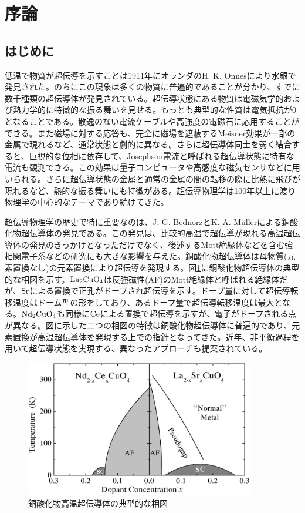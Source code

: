 \section{序論}
\subsection{はじめに}
低温で物質が超伝導を示すことは1911年にオランダのH. K. Onnesにより水銀で発見された。のちにこの現象は多くの物質に普遍的であることが分かり、すでに数千種類の超伝導体が発見されている。超伝導状態にある物質は電磁気学的および熱力学的に特徴的な振る舞いを見せる。もっとも典型的な性質は電気抵抗が0となることである。散逸のない電流ケーブルや高強度の電磁石に応用することができる。また磁場に対する応答も、完全に磁場を遮蔽するMeisner効果が一部の金属で現れるなど、通常状態と劇的に異なる。さらに超伝導体同士を弱く結合すると、巨視的な位相に依存して、Josephson電流と呼ばれる超伝導状態に特有な電流も観測できる。この効果は量子コンピュータや高感度な磁気センサなどに用いられる。さらに超伝導状態の金属と通常の金属の間の転移の際に比熱に飛びが現れるなど、熱的な振る舞いにも特徴がある。超伝導物理学は100年以上に渡り物理学の中心的なテーマであり続けてきた。

超伝導物理学の歴史で特に重要なのは、J. G. BednorzとK. A. M\"ullerによる銅酸化物超伝導体の発見である。この発見は、比較的高温で超伝導が現れる高温超伝導体の発見のきっかけとなっただけでなく、後述するMott絶縁体などを含む強相関電子系などの研究にも大きな影響を与えた。銅酸化物超伝導体は母物質(元素置換なし)の元素置換により超伝導を発現する\cite{Lee2006}。図\ref{fig:phase_diagram}に銅酸化物超伝導体の典型的な相図を示す\cite{Andrea2003}。$\rm La_2CuO_4$は反強磁性(AF)のMott絶縁体と呼ばれる絶縁体だが、$\rm Sr$による置換で正孔がドープされ超伝導を示す。ドープ量に対して超伝導転移温度はドーム型の形をしており、あるドープ量で超伝導転移温度は最大となる。$\rm Nd_2CuO_4$も同様に$\rm Ce$による置換で超伝導を示すが、電子がドープされる点が異なる。図に示した二つの相図の特徴は銅酸化物超伝導体に普遍的であり\cite{Lee2006}、元素置換が高温超伝導体を発現する上での指針となってきた。近年、非平衡過程を用いて超伝導状態を実現する、異なったアプローチも提案されている。
\begin{figure}[htb]
    \begin{center}
   \includegraphics[width=100mm]{Introduction/phase_diagram.eps}
  \end{center}
  \caption{銅酸化物高温超伝導体の典型的な相図\cite{Andrea2003}}
  \label{fig:phase_diagram}
\end{figure}


